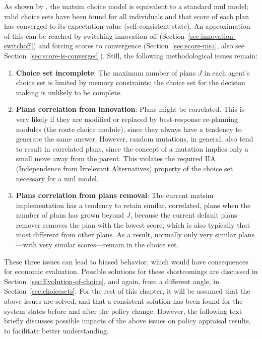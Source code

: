 As shown by \citet[][also see Chapter~\ref{ch:abta} and Section~\ref{sec:score-is-converged}]{NagelFloetteroed2009IatbrResourceInBook}, the \acrshort{matsim} choice model is equivalent to a standard \gls{mnl} model; valid choice sets have been found for all individuals and that score of each plan has converged to its expectation value (self-consistent state).
%
An approximation of this can be reached by switching innovation off (Section~\ref{sec:innovation-switchoff}) and forcing scores to convergence (Section~\ref{sec:score-msa}, also see Section~\ref{sec:score-is-converged}). 
Still, the following methodological issues remain:
%
\begin{enumerate}\styleEnumerate
%
\item \textbf{Choice set incomplete}: The maximum number of plans $J$ in each agent's choice set is limited by memory constraints; the choice set for the decision making is unlikely to be complete.
%
\item \textbf{Plans correlation from innovation}: Plans might be correlated. This is very likely if they are modified or replaced by best-response re-planning modules (\eg the route choice module), since they always have a tendency to generate the same answer. However, random mutations, in general, also tend to result in correlated plans, since the concept of a mutation  implies only a small move away from the parent.  This violates the required IIA (Independence from Irrelevant Alternatives) property of the choice set necessary for a \gls{mnl} model.
%
\item \textbf{Plans correlation from plans removal}: The current \acrshort{matsim} implementation has a tendency to retain similar, \ie  correlated, plans when the number of plans has grown beyond $J$, because the current default plans remover removes the plan with the lowest score, which is also typically that most different from  other plans.  As a result, normally only very similar plans---with very similar scores---remain in the choice set.
%
\end{enumerate}
%
These three issues 
can lead to biased behavior, which would have 
consequences for economic evaluation.  Possible solutions for these shortcomings are discussed 
in Section~\ref{sec:Evolution-of-choice}, and again, from a different angle, in Section~\ref{sec:choicesets}. For the rest of this chapter, it will be assumed that the above issues are solved, and that a consistent solution has been found for the system states before and after the policy change.
%
However, the following text briefly discusses possible impacts of the above issues on policy appraisal results, to facilitate better understanding.

